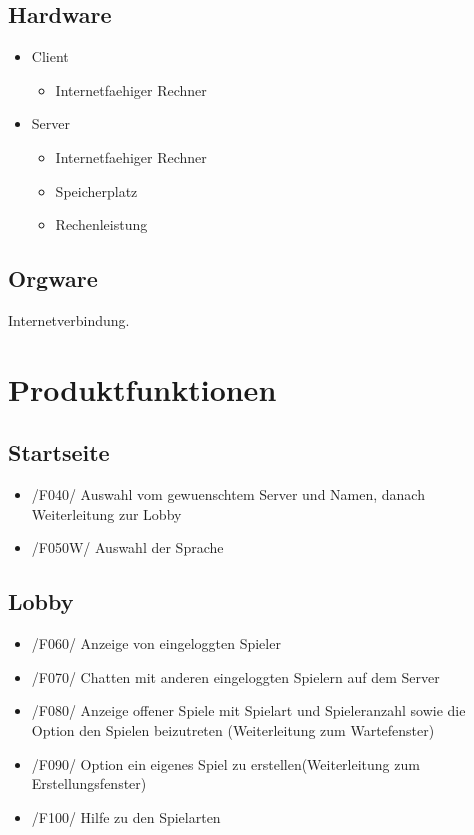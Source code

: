\documentclass{article}
\begin{document}
\subsection{Hardware}
\begin{itemize}
		\item Client
		\begin{itemize}
			\item Internetfaehiger Rechner
		\end{itemize}
		\item Server
		\begin{itemize}
			\item Internetfaehiger Rechner	
			\item Speicherplatz
			\item Rechenleistung
		\end{itemize}
	\end{itemize}

\subsection{Orgware}
Internetverbindung.

\section{Produktfunktionen}
\subsection{Startseite}
\begin{itemize}
	\item /F040/ Auswahl vom gewuenschtem Server und Namen, danach Weiterleitung zur Lobby
	\item /F050W/ Auswahl der Sprache
\end{itemize}

\subsection{Lobby}
\begin{itemize}
	\item /F060/ Anzeige von eingeloggten Spieler
	\item /F070/ Chatten mit anderen eingeloggten Spielern auf dem Server
	\item /F080/ Anzeige offener Spiele mit Spielart und Spieleranzahl sowie die Option den Spielen beizutreten (Weiterleitung zum Wartefenster)
	\item /F090/ Option ein eigenes Spiel zu erstellen(Weiterleitung zum Erstellungsfenster)
	\item /F100/ Hilfe zu den Spielarten
\end{itemize}
\end{document}
